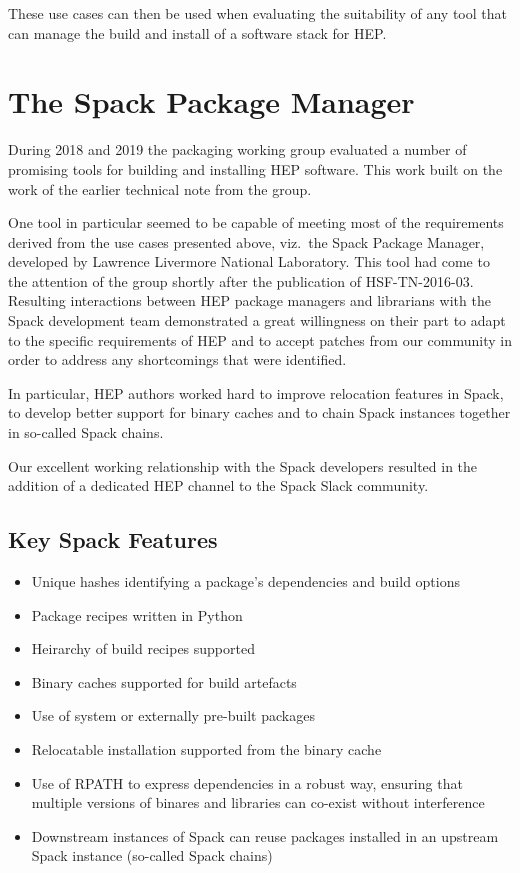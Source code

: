 \documentclass{webofc}
\begin{document}
These use cases can then be used when evaluating the suitability of any 
tool that can manage the build and install of a software stack for HEP.

\section{The Spack Package Manager}
\label{spack}

During 2018 and 2019 the packaging working group evaluated a number
of promising tools for building and installing HEP software. This work
built on the work of the earlier technical note from the group\cite{l_sexton_kennedy_2016_1472340}.

One tool in particular seemed to be capable of meeting most of the requirements
derived from the use cases presented above, viz.\ the Spack Package Manager,
developed by Lawrence Livermore National
Laboratory\cite{10.1145/2807591.2807623}. This tool had come to the attention
of the group shortly after the publication of HSF-TN-2016-03. Resulting
interactions between HEP package managers and librarians with the Spack
development team demonstrated a great willingness on their part to adapt to the
specific requirements of HEP and to accept patches from our community in order
to address any shortcomings that were identified.

In particular, HEP authors worked hard to improve relocation features
in Spack, to develop better support for binary caches and to chain Spack
instances together in so-called Spack chains.

Our excellent working relationship with the Spack developers resulted
in the addition of a dedicated HEP channel to the Spack Slack community.

\subsection{Key Spack Features}
\label{spack-features}

\begin{itemize}
    \item Unique hashes identifying a package's dependencies and build options
    \item Package recipes written in Python
    \item Heirarchy of build recipes supported
    \item Binary caches supported for build artefacts
    \item Use of system or externally pre-built packages
    \item Relocatable installation supported from the binary cache
    \item Use of RPATH to express dependencies in a robust way, ensuring that
        multiple versions of binares and libraries can co-exist without
        interference
    \item Downstream instances of Spack can reuse packages
        installed in an upstream Spack instance (so-called Spack chains)
\end{itemize}
\end{document}
